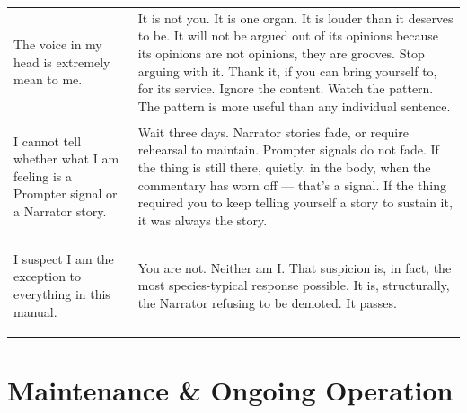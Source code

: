 \documentclass[11pt, letterpaper]{article}
\begin{document}
\begin{center}
\begin{tabularx}{\textwidth}{@{} >{\bfseries\raggedright\arraybackslash}p{5cm} X @{}}
The voice in my head is extremely mean to me. &
It is not you. It is one organ. It is louder than it deserves to be. It will not be argued out of its opinions because its opinions are not opinions, they are grooves. Stop arguing with it. Thank it, if you can bring yourself to, for its service. Ignore the content. Watch the pattern. The pattern is more useful than any individual sentence. \\[8pt]

I cannot tell whether what I am feeling is a Prompter signal or a Narrator story. &
Wait three days. Narrator stories fade, or require rehearsal to maintain. Prompter signals do not fade. If the thing is still there, quietly, in the body, when the commentary has worn off --- that's a signal. If the thing required you to keep telling yourself a story to sustain it, it was always the story. \\[8pt]

I suspect I am the exception to everything in this manual. &
You are not. Neither am I. That suspicion is, in fact, the most species-typical response possible. It is, structurally, the Narrator refusing to be demoted. It passes. \\
\bottomrule
\end{tabularx}
\end{center}

\section{Maintenance \& Ongoing Operation}
\end{document}
